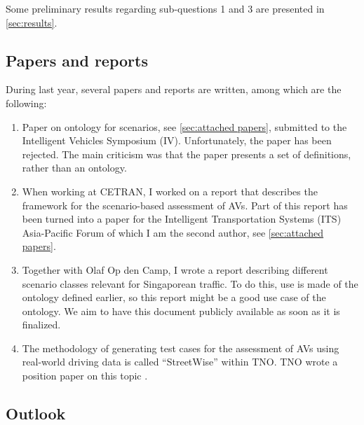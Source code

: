 Some preliminary results regarding sub-questions 1 and 3 are presented in \cref{sec:results}.

\subsection{Papers and reports}
\label{sec:paper}

During last year, several papers and reports are written, among which are the following:
\begin{enumerate}
	\item Paper on ontology for scenarios, see \cref{sec:attached papers}, submitted to the Intelligent Vehicles Symposium (IV). Unfortunately, the paper has been rejected. The main criticism was that the paper presents a set of definitions, rather than an ontology.
	\item When working at CETRAN, I worked on a report that describes the framework for the scenario-based assessment of AVs. Part of this report has been turned into a paper for the Intelligent Transportation Systems (ITS) Asia-Pacific Forum \cite{ploeg2018cetran} of which I am the second author, see \cref{sec:attached papers}.
	\item Together with Olaf Op den Camp, I wrote a report describing different scenario classes relevant for Singaporean traffic. To do this, use is made of the ontology defined earlier, so this report might be a good use case of the ontology. We aim to have this document publicly available as soon as it is finalized. \label{item:scenario classes}
	\item The methodology of generating test cases for the assessment of AVs using real-world driving data is called ``StreetWise'' within TNO. TNO wrote a position paper on this topic \cite{elrofai2018scenario}.
\end{enumerate}

\subsection{Outlook}
\label{sec:outlook}

